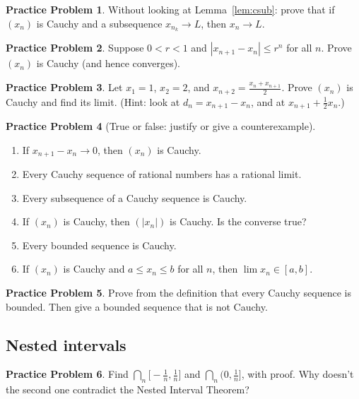 \documentclass[11pt]{article}
\theoremstyle{definition}
\newtheorem{prob}{Practice Problem}
\begin{document}
\begin{prob}\label{prob:c4}
Without looking at Lemma~\ref{lem:csub}: prove that if $(x_n)$ is Cauchy
and a subsequence $x_{n_k}\to L$, then $x_n\to L$.
\end{prob}

\begin{prob}\label{prob:c5}
Suppose $0<r<1$ and $|x_{n+1}-x_n|\le r^n$ for all $n$. Prove $(x_n)$ is
Cauchy (and hence converges).
\end{prob}

\begin{prob}\label{prob:c6}
Let $x_1=1$, $x_2=2$, and $x_{n+2}=\frac{x_n+x_{n+1}}2$. Prove $(x_n)$ is
Cauchy and find its limit. (Hint: look at $d_n=x_{n+1}-x_n$, and at
$x_{n+1}+\frac12x_n$.)
\end{prob}

\begin{prob}[True or false: justify or give a counterexample]\label{prob:c7}\
\begin{enumerate}[label=(\alph*),nosep]
  \item If $x_{n+1}-x_n\to0$, then $(x_n)$ is Cauchy.
  \item Every Cauchy sequence of rational numbers has a rational limit.
  \item Every subsequence of a Cauchy sequence is Cauchy.
  \item If $(x_n)$ is Cauchy, then $(|x_n|)$ is Cauchy. Is the converse
        true?
  \item Every bounded sequence is Cauchy.
  \item If $(x_n)$ is Cauchy and $a\le x_n\le b$ for all $n$, then
        $\lim x_n\in[a,b]$.
\end{enumerate}
\end{prob}

\begin{prob}\label{prob:c8}
Prove from the definition that every Cauchy sequence is bounded. Then give
a bounded sequence that is not Cauchy.
\end{prob}

\subsection*{Nested intervals}

\begin{prob}\label{prob:n1}
Find $\bigcap_{n}\bigl[-\frac1n,\frac1n\bigr]$ and
$\bigcap_n\bigl(0,\frac1n\bigr]$, with proof. Why doesn't the second one
contradict the Nested Interval Theorem?
\end{prob}
\end{document}
